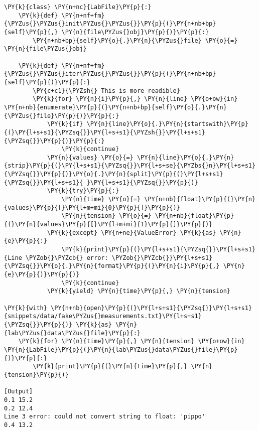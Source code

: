 \begin{Verbatim}[label=\makebox{\url{https://github.com/lucabaldini/cmepda/tree/master/slides/latex/snippets/file\_iterator\_3.py}},commandchars=\\\{\}]
\PY{k}{class} \PY{n+nc}{LabFile}\PY{p}{:}
    \PY{k}{def} \PY{n+nf+fm}{\PYZus{}\PYZus{}init\PYZus{}\PYZus{}}\PY{p}{(}\PY{n+nb+bp}{self}\PY{p}{,} \PY{n}{file\PYZus{}obj}\PY{p}{)}\PY{p}{:}
        \PY{n+nb+bp}{self}\PY{o}{.}\PY{n}{\PYZus{}file} \PY{o}{=} \PY{n}{file\PYZus{}obj}
       
    \PY{k}{def} \PY{n+nf+fm}{\PYZus{}\PYZus{}iter\PYZus{}\PYZus{}}\PY{p}{(}\PY{n+nb+bp}{self}\PY{p}{)}\PY{p}{:}
        \PY{c+c1}{\PYZsh{} This is more readible}
        \PY{k}{for} \PY{n}{i}\PY{p}{,} \PY{n}{line} \PY{o+ow}{in} \PY{n+nb}{enumerate}\PY{p}{(}\PY{n+nb+bp}{self}\PY{o}{.}\PY{n}{\PYZus{}file}\PY{p}{)}\PY{p}{:}
            \PY{k}{if} \PY{n}{line}\PY{o}{.}\PY{n}{startswith}\PY{p}{(}\PY{l+s+s1}{\PYZsq{}}\PY{l+s+s1}{\PYZsh{}}\PY{l+s+s1}{\PYZsq{}}\PY{p}{)}\PY{p}{:}
                \PY{k}{continue}
            \PY{n}{values} \PY{o}{=} \PY{n}{line}\PY{o}{.}\PY{n}{strip}\PY{p}{(}\PY{l+s+s1}{\PYZsq{}}\PY{l+s+se}{\PYZbs{}n}\PY{l+s+s1}{\PYZsq{}}\PY{p}{)}\PY{o}{.}\PY{n}{split}\PY{p}{(}\PY{l+s+s1}{\PYZsq{}}\PY{l+s+s1}{ }\PY{l+s+s1}{\PYZsq{}}\PY{p}{)}
            \PY{k}{try}\PY{p}{:}
                \PY{n}{time} \PY{o}{=} \PY{n+nb}{float}\PY{p}{(}\PY{n}{values}\PY{p}{[}\PY{l+m+mi}{0}\PY{p}{]}\PY{p}{)}
                \PY{n}{tension} \PY{o}{=} \PY{n+nb}{float}\PY{p}{(}\PY{n}{values}\PY{p}{[}\PY{l+m+mi}{1}\PY{p}{]}\PY{p}{)}
            \PY{k}{except} \PY{n+ne}{ValueError} \PY{k}{as} \PY{n}{e}\PY{p}{:}
                \PY{k}{print}\PY{p}{(}\PY{l+s+s1}{\PYZsq{}}\PY{l+s+s1}{Line \PYZob{}\PYZcb{} error: \PYZob{}\PYZcb{}}\PY{l+s+s1}{\PYZsq{}}\PY{o}{.}\PY{n}{format}\PY{p}{(}\PY{n}{i}\PY{p}{,} \PY{n}{e}\PY{p}{)}\PY{p}{)}
                \PY{k}{continue}
            \PY{k}{yield} \PY{n}{time}\PY{p}{,} \PY{n}{tension}

\PY{k}{with} \PY{n+nb}{open}\PY{p}{(}\PY{l+s+s1}{\PYZsq{}}\PY{l+s+s1}{snippets/data/fake\PYZus{}measurements.txt}\PY{l+s+s1}{\PYZsq{}}\PY{p}{)} \PY{k}{as} \PY{n}{lab\PYZus{}data\PYZus{}file}\PY{p}{:}
    \PY{k}{for} \PY{n}{time}\PY{p}{,} \PY{n}{tension} \PY{o+ow}{in} \PY{n}{LabFile}\PY{p}{(}\PY{n}{lab\PYZus{}data\PYZus{}file}\PY{p}{)}\PY{p}{:}
        \PY{k}{print}\PY{p}{(}\PY{n}{time}\PY{p}{,} \PY{n}{tension}\PY{p}{)}

[Output]
0.1 15.2
0.2 12.4
Line 3 error: could not convert string to float: 'pippo'
0.4 13.2
\end{Verbatim}